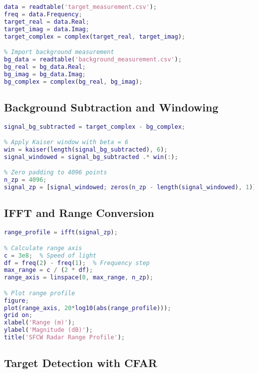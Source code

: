 \documentclass[12pt,a4paper]{article}
\begin{document}
\begin{lstlisting}[language=Matlab, caption=Importing CSV data from VNA into MATLAB]
% Import target measurement
data = readtable('target_measurement.csv');
freq = data.Frequency;
target_real = data.Real;
target_imag = data.Imag;
target_complex = complex(target_real, target_imag);

% Import background measurement
bg_data = readtable('background_measurement.csv');
bg_real = bg_data.Real;
bg_imag = bg_data.Imag;
bg_complex = complex(bg_real, bg_imag);
\end{lstlisting}

\subsection{Background Subtraction and Windowing}

\begin{lstlisting}[language=Matlab, caption=Background subtraction and windowing]
% Subtract background
signal_bg_subtracted = target_complex - bg_complex;

% Apply Kaiser window with beta = 6
win = kaiser(length(signal_bg_subtracted), 6);
signal_windowed = signal_bg_subtracted .* win(:);

% Zero padding to 4096 points
n_zp = 4096;
signal_zp = [signal_windowed; zeros(n_zp - length(signal_windowed), 1)];
\end{lstlisting}

\subsection{IFFT and Range Conversion}

\begin{lstlisting}[language=Matlab, caption=IFFT and range conversion]
% Apply IFFT
range_profile = ifft(signal_zp);

% Calculate range axis
c = 3e8;  % Speed of light
df = freq(2) - freq(1);  % Frequency step
max_range = c / (2 * df);
range_axis = linspace(0, max_range, n_zp);

% Plot range profile
figure;
plot(range_axis, 20*log10(abs(range_profile)));
grid on;
xlabel('Range (m)');
ylabel('Magnitude (dB)');
title('SFCW Radar Range Profile');
\end{lstlisting}

\subsection{Target Detection with CFAR}
\end{document}
